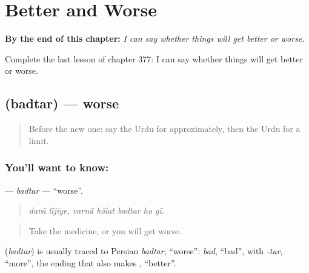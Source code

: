 
\chapter{Better and Worse}
\label{ch:ur-better-and-worse}

\begin{chapteropening}
\textbf{By the end of this chapter:} \emph{I can say whether things will get better or worse.}

Complete the last lesson of chapter 377: I can say whether things will get better or worse.
\end{chapteropening}

\section[\texorpdfstring{\ur{بدتر} (badtar)}{بدتر (badtar)}]{ (badtar) — worse}

\label{lesson:UR-C377-badtar}



\begin{quote}
Before the new one: say the Urdu for approximately, then the Urdu for a limit.
\end{quote}

\subsection*{You'll want to know: }
\textbf{} — \emph{badtar} — \textquotedblleft{}worse\textquotedblright{}.

\begin{quote}
      
\end{quote}

\begin{quote}
\emph{davā lījiye, varnā hālat badtar ho gī.}
\end{quote}

\begin{quote}
Take the medicine, or you will get worse.
\end{quote}

\begin{cousinweb}
\textbf{} (\emph{badtar}) is usually traced to Persian \emph{badtar}, \textquotedblleft{}worse\textquotedblright{}: \emph{bad}, \textquotedblleft{}bad\textquotedblright{}, with \emph{-tar}, \textquotedblleft{}more\textquotedblright{}, the ending that also makes \textbf{}, \textquotedblleft{}better\textquotedblright{}.
\end{cousinweb}

